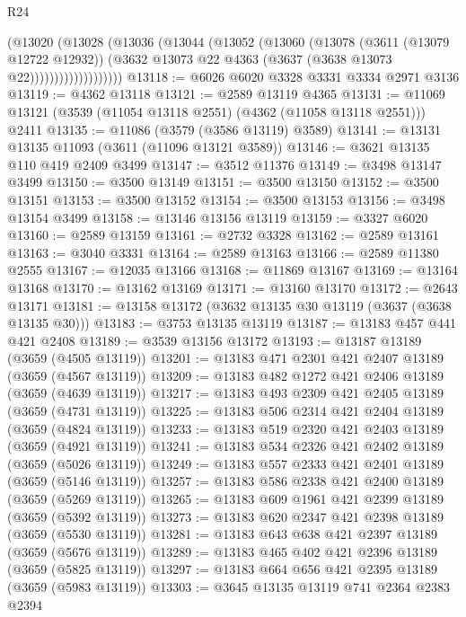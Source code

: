 \begin{lexlean}{R24}
\begin{coremodule}
                      (@13020
                        (@13028
                          (@13036
                            (@13044
                              (@13052
                                (@13060
                                  (@13078
                                    (@3611 (@13079 @12722 @12932))
                                    (@3632
                                      @13073
                                      @22
                                      @4363
                                      (@3637 (@3638 @13073 @22)))))))))))))))))))
@13118 := @6026 @6020 @3328 @3331 @3334 @2971 @3136
@13119 := @4362 @13118
@13121 := @2589 @13119 @4365
@13131 := @11069 @13121 (@3539 (@11054 @13118 @2551) (@4362 (@11058 @13118 @2551))) @2411
@13135 := @11086 (@3579 (@3586 @13119) @3589)
@13141 := @13131 @13135 @11093 (@3611 (@11096 @13121 @3589))
@13146 := @3621 @13135 @110 @419 @2409 @3499
@13147 := @3512 @11376
@13149 := @3498 @13147 @3499
@13150 := @3500 @13149
@13151 := @3500 @13150
@13152 := @3500 @13151
@13153 := @3500 @13152
@13154 := @3500 @13153
@13156 := @3498 @13154 @3499
@13158 := @13146 @13156 @13119
@13159 := @3327 @6020
@13160 := @2589 @13159
@13161 := @2732 @3328
@13162 := @2589 @13161
@13163 := @3040 @3331
@13164 := @2589 @13163
@13166 := @2589 @11380 @2555
@13167 := @12035 @13166
@13168 := @11869 @13167
@13169 := @13164 @13168
@13170 := @13162 @13169
@13171 := @13160 @13170
@13172 := @2643 @13171
@13181 := @13158 @13172 (@3632 @13135 @30 @13119 (@3637 (@3638 @13135 @30)))
@13183 := @3753 @13135 @13119
@13187 := @13183 @457 @441 @421 @2408
@13189 := @3539 @13156 @13172
@13193 := @13187 @13189 (@3659 (@4505 @13119))
@13201 := @13183 @471 @2301 @421 @2407 @13189 (@3659 (@4567 @13119))
@13209 := @13183 @482 @1272 @421 @2406 @13189 (@3659 (@4639 @13119))
@13217 := @13183 @493 @2309 @421 @2405 @13189 (@3659 (@4731 @13119))
@13225 := @13183 @506 @2314 @421 @2404 @13189 (@3659 (@4824 @13119))
@13233 := @13183 @519 @2320 @421 @2403 @13189 (@3659 (@4921 @13119))
@13241 := @13183 @534 @2326 @421 @2402 @13189 (@3659 (@5026 @13119))
@13249 := @13183 @557 @2333 @421 @2401 @13189 (@3659 (@5146 @13119))
@13257 := @13183 @586 @2338 @421 @2400 @13189 (@3659 (@5269 @13119))
@13265 := @13183 @609 @1961 @421 @2399 @13189 (@3659 (@5392 @13119))
@13273 := @13183 @620 @2347 @421 @2398 @13189 (@3659 (@5530 @13119))
@13281 := @13183 @643 @638 @421 @2397 @13189 (@3659 (@5676 @13119))
@13289 := @13183 @465 @402 @421 @2396 @13189 (@3659 (@5825 @13119))
@13297 := @13183 @664 @656 @421 @2395 @13189 (@3659 (@5983 @13119))
@13303 := @3645 @13135 @13119 @741 @2364 @2383 @2394

\end{coremodule}
\end{lexlean}
